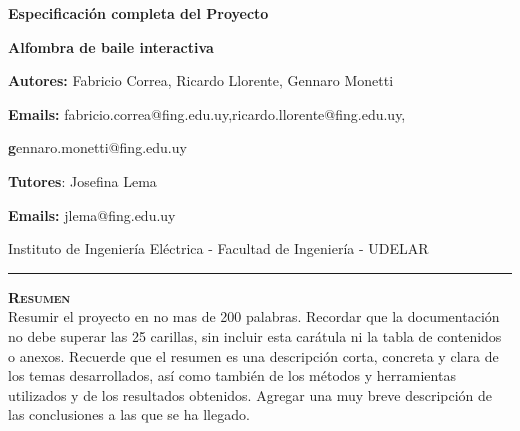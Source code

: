 \documentclass[a4paper,12pt]{article}
\begin{document}
\thispagestyle{firstpage}

\begin{linenumbers} %




  \vspace{0.5in}
  \begin{tcolorbox}
    \centerline{\sc  \large \textbf {Especificaci\'on completa del Proyecto}}
    \vspace{2pc}
    \centerline{\sc \large \textbf {Alfombra de baile interactiva}}
    \vspace{1pc}
    \centerline{\sc \large \textbf {}}
    \vspace{1pc}
    \centerline{\sc \textbf {Autores:} Fabricio Correa, Ricardo Llorente, Gennaro Monetti }
    \vspace{2pc}
    \centerline{\textbf {Emails:} fabricio.correa@fing.edu.uy,ricardo.llorente@fing.edu.uy,}
    \centerline{\textbf gennaro.monetti@fing.edu.uy}
    \vspace{2pc}
    \end{tcolorbox}
    \centerline{\textbf {Tutores}: Josefina Lema}
    \vspace{1pc}
    \centerline{\textbf {Emails:} jlema@fing.edu.uy}
    \vspace{2pc}
    \centerline{Instituto de Ingenier\'ia El\'ectrica - Facultad de Ingenier\'ia - UDELAR}
    \vspace{2pc} 
    \noindent\rule{17cm}{0.4pt}
    \vspace{2pc}
        





  \begin{tcolorbox}
    \textsc{\textbf{Resumen}}\\
    \newline
    Resumir el proyecto en no mas de 200 palabras. Recordar que la documentaci\'on no debe superar las 25 carillas, sin incluir esta car\'atula ni la 
tabla de contenidos o anexos. Recuerde que el resumen es una descripci\'on corta, concreta y clara de los temas desarrollados, as\'i como tambi\'en de los m\'etodos y herramientas utilizados y de los resultados obtenidos. Agregar una muy breve descripci\'on de las conclusiones a las que se ha llegado.
    

\end{tcolorbox}
\end{linenumbers}
\end{document}
